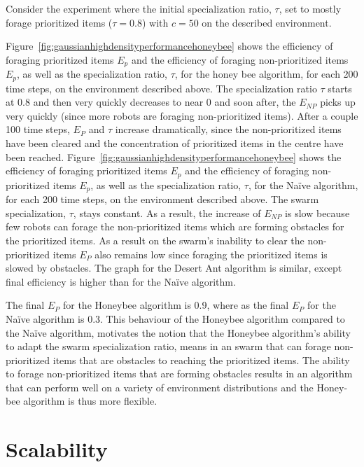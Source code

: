 Consider the experiment where the initial specialization ratio, $\tau$, set to mostly forage prioritized items ($\tau=0.8$) with $c=50$ on the described environment. 

Figure~\ref{fig:gaussianhighdensityperformancehoneybee} shows the efficiency of foraging prioritized items $E_p$ and the efficiency of foraging non-prioritized items $E_p$, as well as the specialization ratio, $\tau$, for the honey bee algorithm, for each 200 time steps, on the environment described above. The specialization ratio $\tau$ starts at 0.8 and then very quickly decreases to near 0 and soon after, the $E_{NP}$ picks up very quickly (since more robots are foraging non-prioritized items). After a couple 100 time steps, $E_{P}$ and $\tau$ increase dramatically, since the non-prioritized items have been cleared and the concentration of prioritized items in the centre have been reached. 
Figure~\ref{fig:gaussianhighdensityperformancehoneybee} shows the efficiency of foraging prioritized items $E_p$ and the efficiency of foraging non-prioritized items $E_p$, as well as the specialization ratio, $\tau$, for the Na\"ive algorithm, for each 200 time steps, on the environment described above. The swarm specialization, $\tau$, stays constant. As a result, the increase of $E_{NP}$ is slow because few robots can forage the non-prioritized items which are forming obstacles for the prioritized items. As a result on the swarm's inability to clear the non-prioritized items $E_P$ also remains low since foraging the prioritized items is slowed by obstacles. The graph for the Desert Ant algorithm is similar, except final efficiency is higher than for the Na\"ive algorithm.

The final $E_P$ for the Honeybee algorithm is 0.9, where as the final $E_P$ for the Na\"ive algorithm is 0.3. This behaviour of the Honeybee algorithm compared to the Na\"ive algorithm, motivates the notion that the Honeybee algorithm's ability to adapt the swarm specialization ratio, means in an swarm that can forage non-prioritized items that are obstacles to reaching the prioritized items. The ability to forage non-prioritized items that are forming obstacles results in an algorithm that can perform well on a variety of environment distributions and the Honey-bee algorithm is thus more flexible.

\section{Scalability}
\label{results:scalability}

